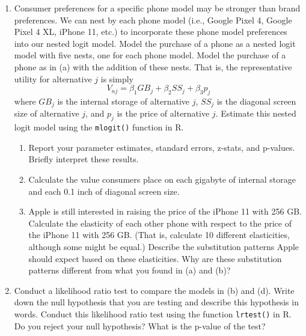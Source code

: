 \documentclass[11pt,letterpaper]{article}
\begin{document}
\begin{enumerate}[label=\alph*., leftmargin=*]
	\item Consumer preferences for a specific phone model may be stronger than brand preferences. We can nest by each phone model (i.e., Google Pixel 4, Google Pixel 4 XL, iPhone 11, etc.) to incorporate these phone model preferences into our nested logit model. Model the purchase of a phone as a nested logit model with five nests, one for each phone model. Model the purchase of a phone as in (a) with the addition of these nests. That is, the representative utility for alternative $j$ is simply
	$$V_{nj} = \beta_1 GB_j + \beta_2 SS_j + \beta_3 p_j$$
	where $GB_j$ is the internal storage of alternative $j$, $SS_j$ is the diagonal screen size of alternative $j$, and $p_j$ is the price of alternative $j$. Estimate this nested logit model using the \texttt{mlogit()} function in R. 
	\begin{enumerate}[label=\roman*.]
		\item Report your parameter estimates, standard errors, z-stats, and p-values. Briefly interpret these results. 
		\item Calculate the value consumers place on each gigabyte of internal storage and each 0.1 inch of diagonal screen size.
		\item Apple is still interested in raising the price of the iPhone 11 with 256 GB. Calculate the elasticity of each other phone with respect to the price of the iPhone 11 with 256 GB. (That is, calculate 10 different elasticities, although some might be equal.) Describe the substitution patterns Apple should expect based on these elasticities. Why are these substitution patterns different from what you found in (a) and (b)?
	\end{enumerate}

	\item Conduct a likelihood ratio test to compare the models in (b) and (d). Write down the null hypothesis that you are testing and describe this hypothesis in words. Conduct this likelihood ratio test using the function \texttt{lrtest()} in R. Do you reject your null hypothesis? What is the p-value of the test?

\end{enumerate}
\end{document}
